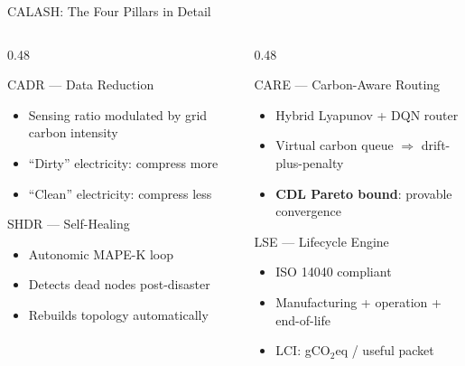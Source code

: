 \documentclass[10pt,aspectratio=169]{beamer}
\begin{document}
\begin{frame}[t]{CALASH: The Four Pillars in Detail}
\begin{columns}[T]
\begin{column}{0.48\textwidth}
  \begin{block}{\faDatabase\; CADR --- Data Reduction}
    \begin{itemize}\small\setlength{\itemsep}{1pt}
      \item Sensing ratio modulated by grid carbon intensity
      \item ``Dirty'' electricity: compress more
      \item ``Clean'' electricity: compress less
    \end{itemize}
  \end{block}
  \vspace{1pt}
  \begin{block}{\faRecycle\; SHDR --- Self-Healing}
    \begin{itemize}\small\setlength{\itemsep}{1pt}
      \item Autonomic MAPE-K loop
      \item Detects dead nodes post-disaster
      \item Rebuilds topology automatically
    \end{itemize}
  \end{block}
\end{column}
\begin{column}{0.48\textwidth}
  \begin{block}{\faRoute\; CARE --- Carbon-Aware Routing}
    \begin{itemize}\small\setlength{\itemsep}{1pt}
      \item Hybrid Lyapunov + DQN router
      \item Virtual carbon queue $\Rightarrow$ drift-plus-penalty
      \item \textbf{CDL Pareto bound}: provable convergence
    \end{itemize}
  \end{block}
  \vspace{1pt}
  \begin{block}{\faBalanceScale\; LSE --- Lifecycle Engine}
    \begin{itemize}\small\setlength{\itemsep}{1pt}
      \item ISO 14040 compliant
      \item Manufacturing + operation + end-of-life
      \item LCI: gCO$_2$eq / useful packet
    \end{itemize}
  \end{block}
\end{column}
\end{columns}
\end{frame}
\end{document}
